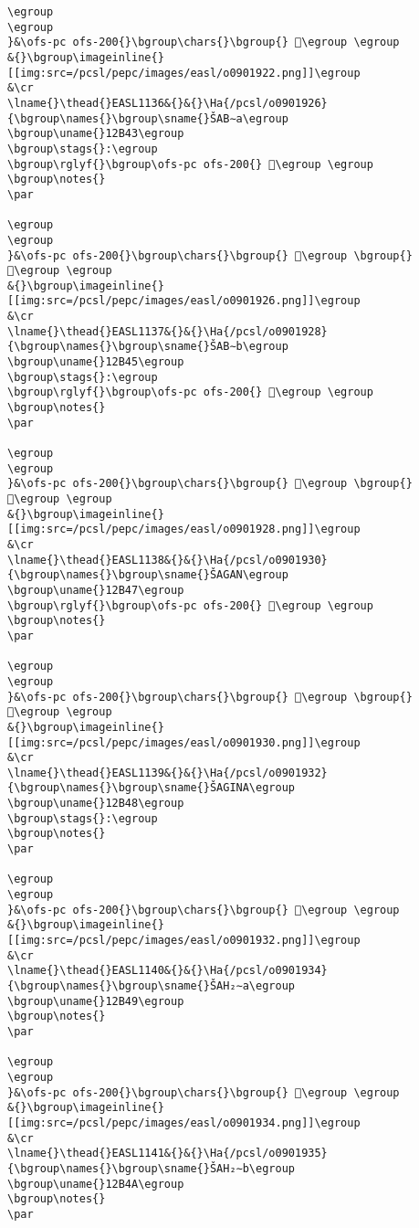 \begin{verbatim}
\egroup
\egroup
}&\ofs-pc ofs-200{}\bgroup\chars{}\bgroup{} 𒭁\egroup \egroup
&{}\bgroup\imageinline{}[[img:src=/pcsl/pepc/images/easl/o0901922.png]]\egroup
&\cr
\lname{}\thead{}EASL1136&{}&{}\Ha{/pcsl/o0901926}{\bgroup\names{}\bgroup\sname{}ŠAB∼a\egroup
\bgroup\uname{}12B43\egroup
\bgroup\stags{}:\egroup
\bgroup\rglyf{}\bgroup\ofs-pc ofs-200{} 𒭃\egroup \egroup
\bgroup\notes{}
\par 

\egroup
\egroup
}&\ofs-pc ofs-200{}\bgroup\chars{}\bgroup{} 𒭂\egroup \bgroup{} 𒭃\egroup \egroup
&{}\bgroup\imageinline{}[[img:src=/pcsl/pepc/images/easl/o0901926.png]]\egroup
&\cr
\lname{}\thead{}EASL1137&{}&{}\Ha{/pcsl/o0901928}{\bgroup\names{}\bgroup\sname{}ŠAB∼b\egroup
\bgroup\uname{}12B45\egroup
\bgroup\stags{}:\egroup
\bgroup\rglyf{}\bgroup\ofs-pc ofs-200{} 𒭅\egroup \egroup
\bgroup\notes{}
\par 

\egroup
\egroup
}&\ofs-pc ofs-200{}\bgroup\chars{}\bgroup{} 𒭄\egroup \bgroup{} 𒭅\egroup \egroup
&{}\bgroup\imageinline{}[[img:src=/pcsl/pepc/images/easl/o0901928.png]]\egroup
&\cr
\lname{}\thead{}EASL1138&{}&{}\Ha{/pcsl/o0901930}{\bgroup\names{}\bgroup\sname{}ŠAGAN\egroup
\bgroup\uname{}12B47\egroup
\bgroup\rglyf{}\bgroup\ofs-pc ofs-200{} 𒭇\egroup \egroup
\bgroup\notes{}
\par 

\egroup
\egroup
}&\ofs-pc ofs-200{}\bgroup\chars{}\bgroup{} 𒭆\egroup \bgroup{} 𒭇\egroup \egroup
&{}\bgroup\imageinline{}[[img:src=/pcsl/pepc/images/easl/o0901930.png]]\egroup
&\cr
\lname{}\thead{}EASL1139&{}&{}\Ha{/pcsl/o0901932}{\bgroup\names{}\bgroup\sname{}ŠAGINA\egroup
\bgroup\uname{}12B48\egroup
\bgroup\stags{}:\egroup
\bgroup\notes{}
\par 

\egroup
\egroup
}&\ofs-pc ofs-200{}\bgroup\chars{}\bgroup{} 𒭈\egroup \egroup
&{}\bgroup\imageinline{}[[img:src=/pcsl/pepc/images/easl/o0901932.png]]\egroup
&\cr
\lname{}\thead{}EASL1140&{}&{}\Ha{/pcsl/o0901934}{\bgroup\names{}\bgroup\sname{}ŠAH₂∼a\egroup
\bgroup\uname{}12B49\egroup
\bgroup\notes{}
\par 

\egroup
\egroup
}&\ofs-pc ofs-200{}\bgroup\chars{}\bgroup{} 𒭉\egroup \egroup
&{}\bgroup\imageinline{}[[img:src=/pcsl/pepc/images/easl/o0901934.png]]\egroup
&\cr
\lname{}\thead{}EASL1141&{}&{}\Ha{/pcsl/o0901935}{\bgroup\names{}\bgroup\sname{}ŠAH₂∼b\egroup
\bgroup\uname{}12B4A\egroup
\bgroup\notes{}
\par 


\end{verbatim}
